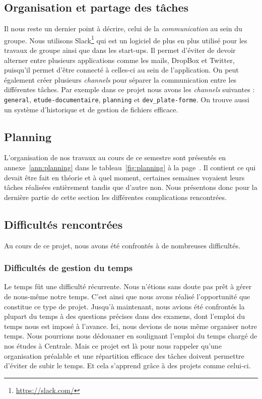\subsection{Organisation et partage des tâches}
Il nous reste un dernier point à décrire, celui de la \emph{communication}
au sein du groupe.
Nous utilisons Slack\footnote{\url{https://slack.com/}} qui est un logiciel
de plus en plus utilisé pour les travaux de groupe ainsi que dans les start-ups.
Il permet d'éviter de devoir alterner entre plusieurs applications comme les mails,
DropBox et Twitter, puisqu'il permet d'être connecté
à celles-ci au sein de l'application.
On peut également créer plusieurs \emph{channels} pour séparer la communication
entre les différentes tâches.
Par exemple dans ce projet nous avons les \emph{channels} suivantes :
\texttt{general}, \texttt{etude-documentaire}, 
\texttt{planning} et \texttt{dev\_plate-forme}.
On trouve aussi un système d'historique et de gestion de fichiers efficace.

\subsection{Planning}
L'organisation de nos travaux au cours de ce semestre
sont présentés en annexe~\ref{ann:planning}
dans le tableau~\ref{fig:planning}
à la page~\pageref{fig:planning}.
Il contient ce qui devait être fait en théorie et à quel moment,
certaines semaines voyaient leurs tâches réalisées entièrement
tandis que d'autre non.
Nous présentons donc pour la dernière partie de cette section
les différentes complications rencontrées.

\subsection{Difficultés rencontrées}

Au cours de ce projet, nous avons été confrontés à de nombreuses difficultés.

\subsubsection{Difficultés de gestion du temps}

Le temps fût une difficulté récurrente. Nous n'étions sans doute pas prêt à gérer de nous-même notre temps. C'est ainsi que nous avons réalisé l'opportunité que constitue ce type de projet. 
Jusqu'à maintenant, nous avions été confrontés la plupart du temps à des questions précises dans des examens, dont l'emploi du temps nous est imposé à l'avance. 
Ici, nous devions de nous même organiser notre temps. 
Nous pourrions nous dédouaner en soulignant l'emploi du temps chargé de nos études à Centrale. 
Mais ce projet est là pour nous rappeler qu'une organisation préalable et une répartition efficace des tâches doivent permettre d'éviter de subir le temps. Et cela s'apprend grâce à des projets comme celui-ci.

